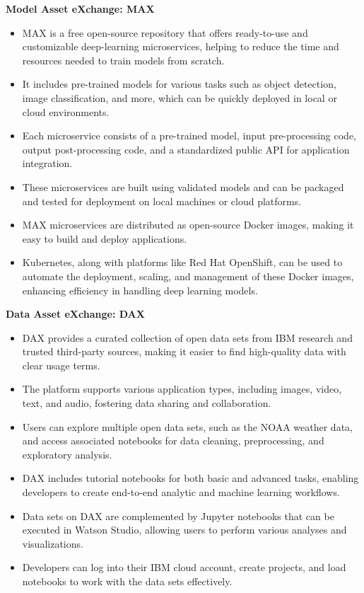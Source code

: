 \documentclass[12pt]{report} %
\begin{document}
		\noindent \textbf{Model Asset eXchange: MAX}		
		
		\begin{itemize}
			\item MAX is a free open-source repository that offers ready-to-use and customizable deep-learning microservices, helping to reduce the time and resources needed to train models from scratch.
			\item It includes pre-trained models for various tasks such as object detection, image classification, and more, which can be quickly deployed in local or cloud environments.
			\item Each microservice consists of a pre-trained model, input pre-processing code, output post-processing code, and a standardized public API for application integration.
			\item These microservices are built using validated models and can be packaged and tested for deployment on local machines or cloud platforms.
			\item MAX microservices are distributed as open-source Docker images, making it easy to build and deploy applications.
			\item Kubernetes, along with platforms like Red Hat OpenShift, can be used to automate the deployment, scaling, and management of these Docker images, enhancing efficiency in handling deep learning models.
		\end{itemize}
		
		
		\noindent \textbf{Data Asset eXchange: DAX}		
		
		\begin{itemize}
			\item DAX provides a curated collection of open data sets from IBM research and trusted third-party sources, making it easier to find high-quality data with clear usage terms.
			\item The platform supports various application types, including images, video, text, and audio, fostering data sharing and collaboration.
			\item Users can explore multiple open data sets, such as the NOAA weather data, and access associated notebooks for data cleaning, preprocessing, and exploratory analysis.
			\item DAX includes tutorial notebooks for both basic and advanced tasks, enabling developers to create end-to-end analytic and machine learning workflows.
			\item Data sets on DAX are complemented by Jupyter notebooks that can be executed in Watson Studio, allowing users to perform various analyses and visualizations.
			\item Developers can log into their IBM cloud account, create projects, and load notebooks to work with the data sets effectively.
		\end{itemize}
	
\end{document}
